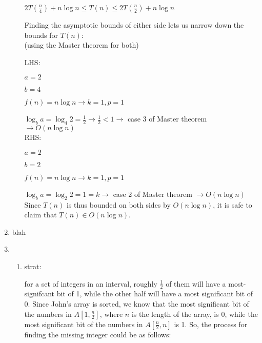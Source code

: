 \documentclass[12pt]{article}
\begin{document}
\begin{enumerate}
\begin{enumerate}
        \centerline{$2T(\frac{n}{4}) + n\log n \leq T(n) \leq 2T(\frac{n}{2}) + n\log n$}

        Finding the asymptotic bounds of either side lets us narrow down the bounds for $T(n)$:\\

        (using the Master theorem for both)

        LHS:

        $a = 2$

        $b = 4$

        $f(n) = n\log n \longrightarrow k = 1, p = 1$

        $\log_{b}{a} = \log_{4}{2} = \frac{1}{2} \longrightarrow \frac{1}{2} < 1 \longrightarrow$ case 3 of Master theorem
        $\longrightarrow O(n\log n)$\\

        RHS:

        $a = 2$

        $b = 2$

        $f(n) = n\log n \longrightarrow k = 1, p = 1$

        $\log_{b}{a} = \log_{2}{2} = 1 = k \longrightarrow$ case 2 of Master theorem 
        $\longrightarrow O(n\log n)$\\

        Since $T(n)$ is thus bounded on both sides by $O(n\log n)$, it is safe to claim that $T(n) \in O(n\log n)$.

    \end{enumerate}
    \item blah
    \item \begin{enumerate}
        \item strat:
        
        for a set of integers in an interval, roughly $\frac{1}{2}$ of them will have a most-signifcant bit of 1, while the 
        other half will have a most significant bit of 0. Since John's array is sorted, we know that the most significant 
        bit of the numbers in $A[1, \frac{n}{2}]$, where $n$ is the length of the array, is 0, while the most significant 
        bit of the numbers in $A[\frac{n}{2}, n]$ is 1. So, the process for finding the missing integer could be as follows:
        

\end{enumerate}
\end{enumerate}
\end{document}
